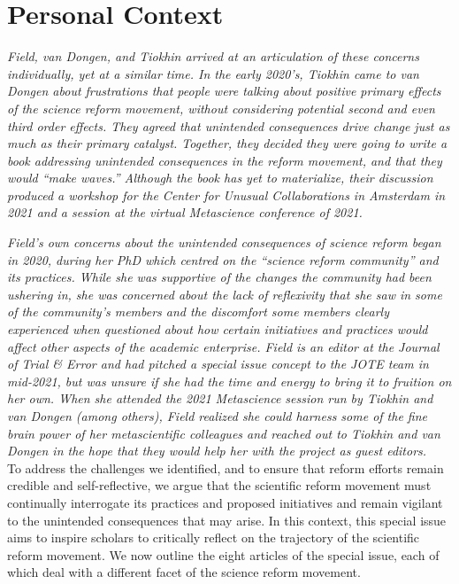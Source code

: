 \documentclass[authordate, editorial, noabstract, issue]{jote-new-article}
\begin{document}
\section{Personal Context}



\emph{Field, van Dongen, and Tiokhin arrived at an articulation of these concerns individually, yet at a similar time. In the early 2020's, Tiokhin came to van Dongen about frustrations that people were talking about positive primary effects of the science reform movement, without considering potential second and even third order effects. They agreed that unintended consequences drive change just as much as their primary catalyst. Together, they decided they were going to write a book addressing unintended consequences in the reform movement, and that they would “make waves.” Although the book has yet to materialize, their discussion produced a workshop for the Center for Unusual Collaborations in Amsterdam in 2021 and a session at the virtual Metascience conference of 2021. }



\emph{Field's own concerns about the unintended consequences of science reform began in 2020, during her PhD which centred on the “science reform community” and its practices. While she was supportive of the changes the community had been ushering in, she was concerned about the lack of reflexivity that she saw in some of the community's members and the discomfort some members clearly experienced when questioned about how certain initiatives and practices would affect other aspects of the academic enterprise. Field is an editor at the Journal of Trial \& Error and had pitched a special issue concept to the JOTE team in mid-2021, but was unsure if she had the time and energy to bring it to fruition on her own. When she attended the 2021 Metascience session run by Tiokhin and van Dongen (among others), Field realized she could harness some of the fine brain power of her metascientific colleagues and reached out to Tiokhin and van Dongen in the hope that they would help her with the project as guest editors. }\\







To address the challenges we identified, and to ensure that reform efforts remain credible and self-reflective, we argue that the scientific reform movement must continually interrogate its practices and proposed initiatives and remain vigilant to the unintended consequences that may arise. In this context, this special issue aims to inspire scholars to critically reflect on the trajectory of the scientific reform movement. We now outline the eight articles of the special issue, each of which deal with a different facet of the science reform movement.
\end{document}
